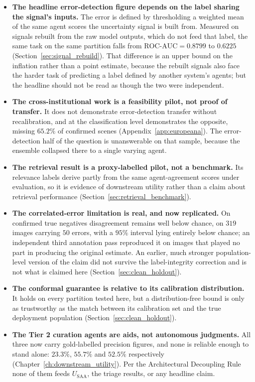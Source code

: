 \documentclass[12pt,a4paper]{report}
\begin{document}
\begin{itemize}
    \item \textbf{The headline error-detection figure depends on the label sharing the signal's inputs.} The error is defined by thresholding a weighted mean of the same agent scores the uncertainty signal is built from. Measured on signals rebuilt from the raw model outputs, which do not feed that label, the same task on the same partition falls from $\text{ROC-AUC}=0.8799$ to $0.6225$ (Section~\ref{sec:signal_rebuild}). That difference is an upper bound on the inflation rather than a point estimate, because the rebuilt signals also face the harder task of predicting a label defined by another system's agents; but the headline should not be read as though the two were independent.
    \item \textbf{The cross-institutional work is a feasibility pilot, not proof of transfer.} It does not demonstrate error-detection transfer without recalibration, and at the classification level demonstrates the opposite, missing $65.2\%$ of confirmed scenes (Appendix~\ref{app:europeana}). The error-detection half of the question is unanswerable on that sample, because the ensemble collapsed there to a single varying agent.
    \item \textbf{The retrieval result is a proxy-labelled pilot, not a benchmark.} Its relevance labels derive partly from the same agent-agreement scores under evaluation, so it is evidence of downstream utility rather than a claim about retrieval performance (Section~\ref{sec:retrieval_benchmark}).
    \item \textbf{The correlated-error limitation is real, and now replicated.} On confirmed true negatives disagreement remains well below chance, on $319$ images carrying $50$ errors, with a $95\%$ interval lying entirely below chance; an independent third annotation pass reproduced it on images that played no part in producing the original estimate. An earlier, much stronger population-level version of the claim did not survive the label-integrity correction and is not what is claimed here (Section~\ref{sec:clean_holdout}).
    \item \textbf{The conformal guarantee is relative to its calibration distribution.} It holds on every partition tested here, but a distribution-free bound is only as trustworthy as the match between its calibration set and the true deployment population (Section~\ref{sec:clean_holdout}).
    \item \textbf{The Tier 2 curation agents are aids, not autonomous judgments.} All three now carry gold-labelled precision figures, and none is reliable enough to stand alone: $23.3\%$, $55.7\%$ and $52.5\%$ respectively (Chapter~\ref{ch:downstream_utility}). Per the Architectural Decoupling Rule none of them feeds $U_{\text{SAA}}$, the triage results, or any headline claim.
\end{itemize}
\end{document}
